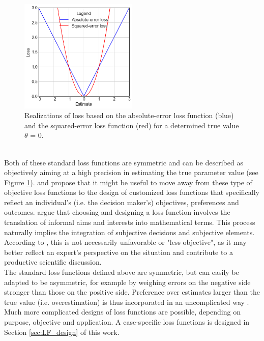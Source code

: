         \begin{figure}[h]
        	\centering
        	\includegraphics[width=0.5\textwidth]{Figures/abs_sqr_det.png}
        	\caption{Realizations of loss based on the absolute-error loss function (blue) and the squared-error loss function (red) for a determined true value $\theta$ = 0.}\label{fig:abs_sqr_det} 
        \end{figure}\\
        Both of these standard loss functions are symmetric and can be described as objectively aiming at a high precision in estimating the true parameter value (see Figure \ref{fig:abs_sqr_det}).
        \citet{davidson2015} and \citet{hennig2007} propose that it might be useful to move away from these type of objective loss functions to the design of customized loss functions that specifically reflect an individual's (i.e. the decision maker's) objectives, preferences and outcomes. \citet{hennig2007} argue that choosing and designing a loss function involves the translation of informal aims and interests into mathematical terms. This process naturally implies the integration of subjective decisions and subjective elements. According to \citet{hennig2007}, this is not necessarily unfavorable or "less objective", as it may better reflect an expert's perspective on the situation and contribute to a productive scientific discussion.\\        
        The standard loss functions defined above are symmetric, but can easily be adapted to be asymmetric, for example by weighing errors on the negative side stronger than those on the positive side. Preference over estimates larger than the true value (i.e. overestimation) is thus incorporated in an uncomplicated way \citep{davidson2015, hennig2007}. Much more complicated designs of loss functions are possible, depending on purpose, objective and application. A case-specific loss functions is designed in Section \ref{sec:LF_design} of this work.\\
